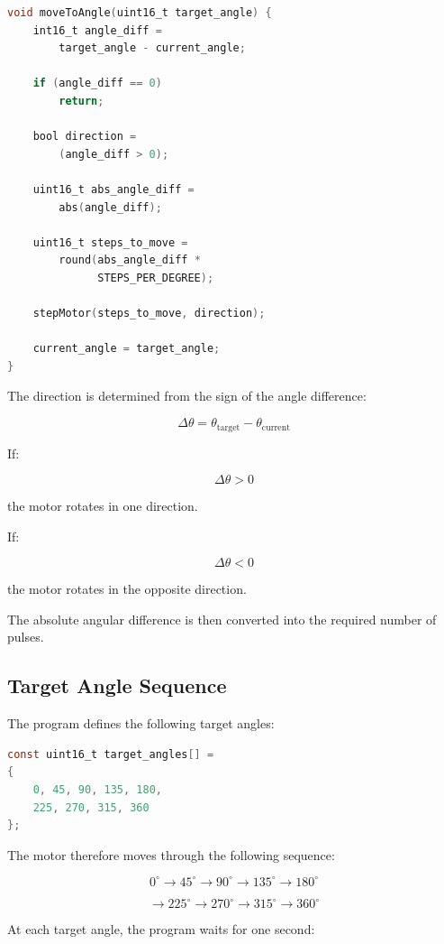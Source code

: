\documentclass[12pt,a4paper]{article}
\begin{document}
\begin{lstlisting}[language=C]
void moveToAngle(uint16_t target_angle) {
    int16_t angle_diff =
        target_angle - current_angle;

    if (angle_diff == 0)
        return;

    bool direction =
        (angle_diff > 0);

    uint16_t abs_angle_diff =
        abs(angle_diff);

    uint16_t steps_to_move =
        round(abs_angle_diff *
              STEPS_PER_DEGREE);

    stepMotor(steps_to_move, direction);

    current_angle = target_angle;
}
\end{lstlisting}

The direction is determined from the sign of the angle difference:

\[
\Delta\theta
=
\theta_{\mathrm{target}}
-
\theta_{\mathrm{current}}
\]

If:

\[
\Delta\theta > 0
\]

the motor rotates in one direction.

If:

\[
\Delta\theta < 0
\]

the motor rotates in the opposite direction.

The absolute angular difference is then converted into the required
number of pulses.

\subsection{Target Angle Sequence}

The program defines the following target angles:

\begin{lstlisting}[language=C]
const uint16_t target_angles[] =
{
    0, 45, 90, 135, 180,
    225, 270, 315, 360
};
\end{lstlisting}

The motor therefore moves through the following sequence:

\[
0^\circ
\rightarrow
45^\circ
\rightarrow
90^\circ
\rightarrow
135^\circ
\rightarrow
180^\circ
\]

\[
\rightarrow
225^\circ
\rightarrow
270^\circ
\rightarrow
315^\circ
\rightarrow
360^\circ
\]

At each target angle, the program waits for one second:
\end{document}
